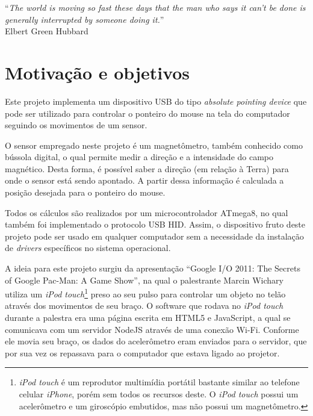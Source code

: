 \documentclass[brazil,pagestart=firstchapter]{abnt}
\begin{document}
\vfill{}
\begin{flushright}{}
``\emph{The world is moving so fast these days that the man who says it
can't be done is generally interrupted by someone doing it.}''\\
{\small Elbert Green Hubbard}
\end{flushright}{\small \par}
\vfill{}

\newpage


\section{Motivação e objetivos}
\label{sec:motivacao}

Este projeto implementa um dispositivo \acs{USB} do tipo \textit{absolute
pointing device} que pode ser utilizado para controlar o ponteiro do mouse
na tela do computador seguindo os movimentos de um sensor.

O sensor empregado neste projeto é um magnetômetro, também conhecido como
bússola digital, o qual permite medir a direção e a intensidade do campo
magnético. Desta forma, é possível saber a direção (em relação à Terra) para
onde o sensor está sendo apontado. A partir dessa informação é calculada
a posição desejada para o ponteiro do mouse.

Todos os cálculos são realizados por um microcontrolador ATmega8, no qual
também foi implementado o protocolo \acs{USB} \acs{HID}. Assim, o
dispositivo fruto deste projeto pode ser usado em qualquer computador sem a
necessidade da instalação de \textit{drivers} específicos no sistema
operacional.

A ideia para este projeto surgiu da apresentação ``Google I/O 2011: The
Secrets of Google Pac-Man: A Game Show'', na qual o palestrante Marcin
Wichary utiliza um \textit{iPod touch}\footnote{
	\textit{iPod touch} é um reprodutor multimídia portátil bastante similar
	ao telefone celular \textit{iPhone}, porém sem todos os recursos deste.
	O \textit{iPod touch} possui um acelerômetro e um giroscópio embutidos,
	mas não possui um magnetômetro.
} preso ao seu pulso para controlar um objeto no telão através dos
movimentos de seu braço. \cite[2min29s a 4min40s]{GoogleIO2011} O software
que rodava no \textit{iPod touch} durante a palestra era uma página escrita
em HTML5 e JavaScript, a qual se comunicava com um servidor NodeJS através
de uma conexão Wi-Fi. Conforme ele movia seu braço, os dados do acelerômetro
eram enviados para o servidor, que por sua vez os repassava para o
computador que estava ligado ao projetor.
\end{document}
